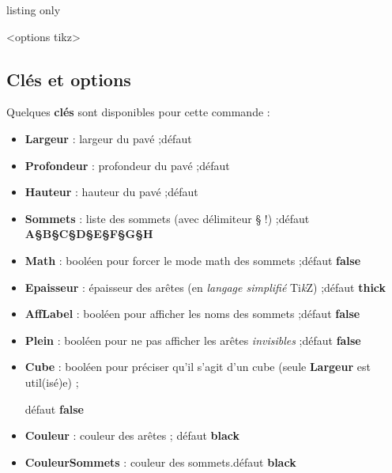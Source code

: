 \documentclass[french,a4paper,11pt]{article}
\providecommand\tikzlogo{Ti\textit{k}Z}
\let\TikZ\tikzlogo
\newcommand\Cle[1]{{\bfseries\sffamily\textlangle #1\textrangle}}
\begin{document}
\begin{PresCodeTex}{listing only}
\begin{EnvTikzEspace}[Clés]<options tikz>
	\PaveTikzTriDim[clés]
\end{EnvTikzEspace}
\end{PresCodeTex}

\begin{PresCode}{}
\begin{EnvTikzEspace}[VueClassique]
	\PaveTikzTriDim
\end{EnvTikzEspace}
\hspace{1cm}
\begin{EnvTikzEspace}
	\PaveTikzTriDim
\end{EnvTikzEspace}
\end{PresCode}

\subsection{Clés et options}

\begin{tipblock}
Quelques \Cle{clés} sont disponibles pour cette commande :

\begin{itemize}
	\item \Cle{Largeur} : largeur du pavé ;\hfill{}défaut \Cle{2}
	\item \Cle{Profondeur} : profondeur du pavé ;\hfill{}défaut \Cle{1}
	\item \Cle{Hauteur} : hauteur du pavé ;\hfill{}défaut \Cle{1.25}
	\item \Cle{Sommets} : liste des sommets (avec délimiteur § !) ;\hfill{}défaut \Cle{A§B§C§D§E§F§G§H}
	\item \Cle{Math} : booléen pour forcer le mode math des sommets ;\hfill{}défaut \Cle{false}
	\item \Cle{Epaisseur} : épaisseur des arêtes (en \textit{langage simplifié} \TikZ) ;\hfill{}défaut \Cle{thick}
	\item \Cle{AffLabel} : booléen pour afficher les noms des sommets ;\hfill{}défaut \Cle{false}
	\item \Cle{Plein} : booléen pour ne pas afficher les arêtes \textit{invisibles} ;\hfill{}défaut \Cle{false}
	\item \Cle{Cube} : booléen pour préciser qu'il s'agit d'un cube (seule \Cle{Largeur} est util(isé)e) ;
	
	\hfill{}défaut \Cle{false}
	\item \Cle{Couleur} : couleur des arêtes ; \hfill{}défaut \Cle{black}
	
	\item \Cle{CouleurSommets} : couleur des sommets.\hfill{}défaut \Cle{black}
\end{itemize}
\vspace*{-\baselineskip}\leavevmode
\end{tipblock}
\end{document}
